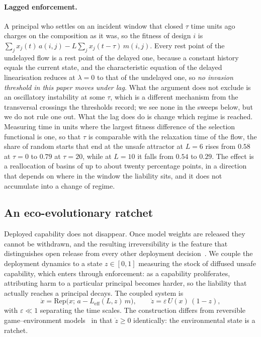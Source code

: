 \documentclass[pdflatex]{sn-jnl}
\theoremstyle{thmstyleone}
\theoremstyle{thmstylethree}
\theoremstyle{thmstyletwo}
\begin{document}
\paragraph{Lagged enforcement.}
A principal who settles on an incident window that closed $\tau$ time units
ago charges on the composition as it was, so the fitness of design $i$ is
$\sum_j x_j(t)\,a(i,j)-L\sum_j x_j(t-\tau)\,m(i,j)$. Every rest point of the
undelayed flow is a rest point of the delayed one, because a constant history
equals the current state, and the characteristic equation of the delayed
linearisation reduces at $\lambda=0$ to that of the undelayed one, so
\emph{no invasion threshold in this paper moves under lag}. What the argument
does not exclude is an oscillatory instability at some $\tau$, which is a
different mechanism from the transversal crossings the thresholds record; we
see none in the sweeps below, but we do not rule one out. What the lag does do
is change which regime is reached. Measuring time in units
where the largest fitness difference of the selection functional is one, so
that $\tau$ is comparable with the relaxation time of the flow, the share of
random starts that end at the unsafe attractor at $L=6$ rises from $0.58$ at
$\tau=0$ to $0.79$ at $\tau=20$, while at $L=10$ it falls from $0.54$ to
$0.29$. The effect is a reallocation of basins of up to about twenty
percentage points, in a direction that depends on where in the window the
liability sits, and it does not accumulate into a change of regime.

\subsection{An eco-evolutionary ratchet}\label{sec:ratchet}

Deployed capability does not disappear. Once model weights are released they
cannot be withdrawn, and the resulting irreversibility is the feature that
distinguishes open release from every other deployment
decision~\citep{seger2023opensourcing,kapoor2024societal}. We couple the
deployment dynamics to a
state $z\in[0,1]$ measuring the stock of diffused unsafe capability, which
enters through enforcement: as a capability proliferates, attributing harm to
a particular principal becomes harder, so the liability that actually reaches
a principal decays. The coupled system is
\begin{equation}
\dot{x}=\mathrm{Rep}\big(x;\,a-L_{\mathrm{eff}}(L,z)\,m\big),
\qquad
\dot{z}=\varepsilon\,U(x)\,(1-z),
\label{eq:coupled}
\end{equation}
with $\varepsilon\ll 1$ separating the time scales. The construction differs
from reversible game--environment models~\citep{weitz2016oscillating,hauert2019asymmetric,tilman2020feedbacks} in that
$\dot z\ge 0$ identically: the environmental state is a ratchet.
\end{document}
